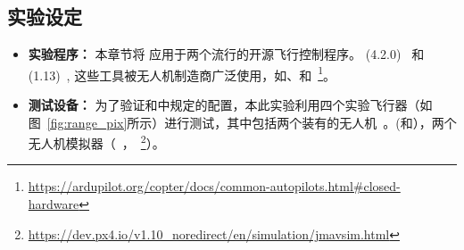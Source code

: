 \subsection{实验设定}

\begin{itemize}
    \item \textbf{实验程序：}
本章节将 \icsearcher 应用于两个流行的开源飞行控制程序。
 (4.2.0)~\cite{ardupilot} 和  (1.13)~\cite{px4}, 这些工具被无人机制造商广泛使用，如、和~\footnote{\url{https://ardupilot.org/copter/docs/common-autopilots.html\#closed-hardware}}。

\item \textbf{测试设备：}
为了验证和中规定的配置，本此实验利用四个实验飞行器（如图~\ref{fig:range_pix}所示）进行测试，其中包括两个装有的无人机~\cite{meier2011pixhawk}。(和），两个无人机模拟器（~\cite{airsim2017fsr}，~\footnote{\url{https://dev.px4.io/v1.10_noredirect/en/simulation/jmavsim.html}}）。

\begin{figure}[htb]


\end{figure}
\end{itemize}
